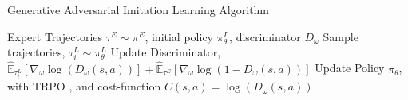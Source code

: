 \begin{algorithm}
\caption{Generative Adversarial Imitation Learning Algorithm}\label{alg:gail}
\begin{algorithmic}
\Require Expert Trajectories $\tau^{E} \sim \pi^{E}$, initial policy $\pi^{L}_{\theta}$, discriminator $D_{\omega}$
    \State Sample trajectories, $\tau^{L}_{i} \sim \pi^{L}_{\theta}$
    \State Update Discriminator, $\mathbb{\hat{E}}_{\tau^{L}_{i}}\left [\nabla_{\omega} \log(D_{\omega}(s,a))\right ] +\mathbb{\hat{E}}_{\tau^{E}}\left [\nabla_{\omega} \log(1 - D_{\omega}(s,a))\right ]$
    \State Update Policy $\pi_{\theta}$, with TRPO \cite{schulman2015trpo}, and cost-function $C(s,a)=\log(D_{\omega}(s,a))$ 
\EndFor
\end{algorithmic}
\end{algorithm}